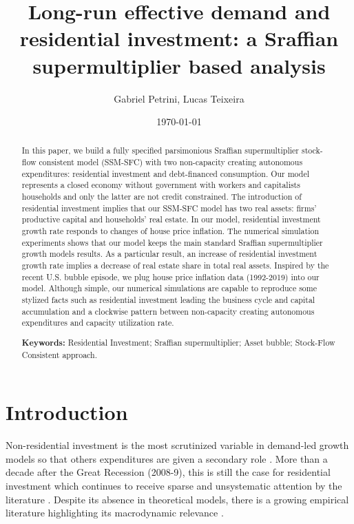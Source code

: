 \documentclass[12pt]{article}
\author{Gabriel Petrini, Lucas Teixeira}
\date{\today}
\title{Long-run effective demand and residential investment: a Sraffian supermultiplier based analysis}
\begin{document}
\maketitle
\begin{abstract}
In this paper, we build a fully specified parsimonious Sraffian supermultiplier stock-flow consistent model (SSM-SFC) with two non-capacity creating autonomous expenditures: residential investment and debt-financed consumption.
Our model represents a closed economy without government with workers and capitalists households and only the latter are not credit constrained.
The introduction of residential investment implies that our SSM-SFC model has two real assets: firms' productive capital and households' real estate.
In our model, residential investment growth rate responds to changes of house price inflation.
The numerical simulation experiments shows that our model keeps the main standard Sraffian supermultiplier growth models results.
As a particular result, an increase of residential investment growth rate implies a decrease of real estate share in total real assets.
Inspired by the recent U.S. bubble episode, we plug house price inflation data (1992-2019) into our model.
Although simple, our numerical simulations are capable to reproduce some stylized facts such as residential investment leading the business cycle and capital accumulation and a clockwise pattern between non-capacity creating autonomous expenditures and capacity utilization rate.

\noindent \textbf{Keywords:} Residential Investment; Sraffian supermultiplier; Asset bubble;  Stock-Flow Consistent approach.
\end{abstract}

\doublespacing
\setlength{\parindent}{4em}
\setlength{\parskip}{1em}


\section{Introduction}
\label{sec:orga177153}
\label{sec:introduction}
Non-residential investment is the most scrutinized variable in demand-led growth models so that others expenditures are given a secondary role \cite{brochier_macroeconomics_2017}.
More than a decade after the Great Recession (2008-9), this is still the case for residential investment which continues to receive sparse and unsystematic attention by the literature \cites{caverzasi_stock-flow_2013}{nikolaidi_minsky_2017}.
Despite its absence in theoretical models, there is a growing empirical literature highlighting its macrodynamic relevance \cites{leamer_housing_2007}{jorda_great_2016}{fiebiger_semi-autonomous_2018}{fiebiger_trend_2017}.
\end{document}
